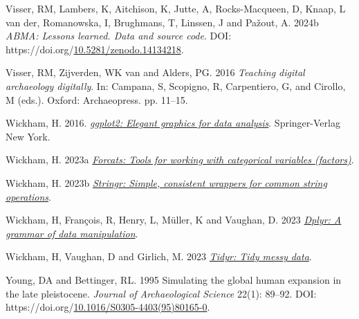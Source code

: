 \documentclass[
]{article}
\newlength{\cslhangindent}
\newlength{\cslentryspacingunit} %
\newenvironment{CSLReferences}[2] %
 {%
  \setlength{\parindent}{0pt}
  \ifodd #1
  \let\oldpar\par
  \def\par{\hangindent=\cslhangindent\oldpar}
  \fi
  \setlength{\parskip}{#2\cslentryspacingunit}
 }%
 {}
\begin{document}
\begin{CSLReferences}{1}{0}
\leavevmode{}%
Visser, RM, Lambers, K, Aitchison, K, Jutte, A, Rocks-Macqueen, D, Knaap, L van der, Romanowska, I, Brughmans, T, Linssen, J and Pažout, A. 2024b \emph{ABMA: Lessons learned. Data and source code}. DOI: https://doi.org/\href{https://doi.org/10.5281/zenodo.14134218}{10.5281/zenodo.14134218}.

\leavevmode{}%
Visser, RM, Zijverden, WK van and Alders, PG. 2016 \emph{Teaching digital archaeology digitally}. In: Campana, S, Scopigno, R, Carpentiero, G, and Cirollo, M (eds.). Oxford: Archaeopress. pp. 11--15.

\leavevmode{}%
Wickham, H. 2016. \emph{\href{http://ggplot2.org}{ggplot2: Elegant graphics for data analysis}}. Springer-Verlag New York.

\leavevmode{}%
Wickham, H. 2023a \emph{\href{https://forcats.tidyverse.org/}{Forcats: Tools for working with categorical variables (factors)}}.

\leavevmode{}%
Wickham, H. 2023b \emph{\href{https://stringr.tidyverse.org}{Stringr: Simple, consistent wrappers for common string operations}}.

\leavevmode{}%
Wickham, H, François, R, Henry, L, Müller, K and Vaughan, D. 2023 \emph{\href{https://dplyr.tidyverse.org}{Dplyr: A grammar of data manipulation}}.

\leavevmode{}%
Wickham, H, Vaughan, D and Girlich, M. 2023 \emph{\href{https://tidyr.tidyverse.org}{Tidyr: Tidy messy data}}.

\leavevmode{}%
Young, DA and Bettinger, RL. 1995 Simulating the global human expansion in the late pleistocene. \emph{Journal of Archaeological Science} 22(1): 89--92. DOI: https://doi.org/\href{https://doi.org/10.1016/S0305-4403(95)80165-0}{10.1016/S0305-4403(95)80165-0}.

\end{CSLReferences}
\end{document}
